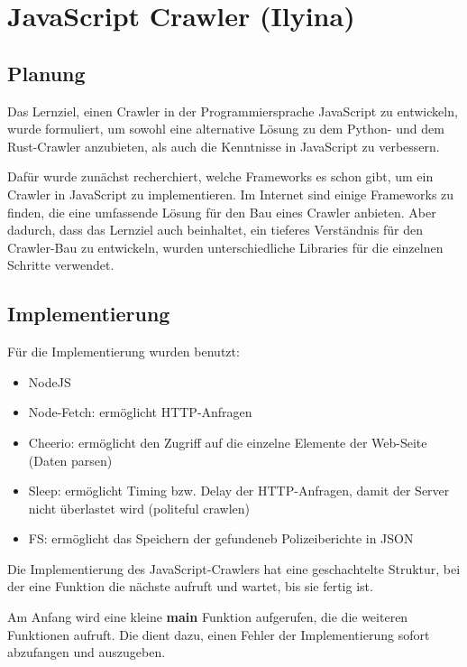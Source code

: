 

\chapter{JavaScript Crawler \small(Ilyina)}
\label{ch: JavaScript Crawler}

\section{Planung}
\label{sub:js_planung}

Das Lernziel, einen Crawler in der Programmiersprache JavaScript zu entwickeln,
wurde formuliert, um sowohl eine alternative Lösung zu dem Python- und
dem Rust-Crawler anzubieten, als auch die Kenntnisse in JavaScript zu verbessern.

Dafür wurde zunächst recherchiert, welche Frameworks es schon gibt, um ein Crawler
in JavaScript zu implementieren. Im Internet sind einige Frameworks zu finden,
die eine umfassende Lösung für den Bau eines Crawler anbieten. Aber dadurch,
dass das Lernziel auch beinhaltet, ein tieferes Verständnis für den Crawler-Bau
zu entwickeln, wurden unterschiedliche Libraries für die einzelnen Schritte
verwendet.

\section{Implementierung}
\label{sub:js_implementierung}

Für die Implementierung wurden benutzt:

\begin{itemize}
  \item
    NodeJS
  \item
    Node-Fetch: ermöglicht HTTP-Anfragen
  \item
    Cheerio: ermöglicht den Zugriff auf die einzelne Elemente der Web-Seite (Daten parsen)
  \item
    Sleep: ermöglicht Timing bzw. Delay der HTTP-Anfragen,
    damit der Server nicht überlastet wird (politeful crawlen)
  \item
    FS: ermöglicht das Speichern der gefundeneb Polizeiberichte in JSON
\end{itemize}

Die Implementierung des JavaScript-Crawlers hat eine geschachtelte Struktur,
bei der eine Funktion die nächste aufruft und wartet, bis sie fertig ist.

Am Anfang  wird eine kleine \textbf{main} Funktion aufgerufen, die die weiteren Funktionen
aufruft. Die dient dazu, einen Fehler der Implementierung sofort abzufangen und auszugeben.

